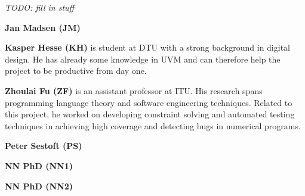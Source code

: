 \documentclass[fleqn,12pt]{article}
\newcommand{\todo}[1]{{\it TODO: #1}}
\begin{document}
\todo{fill in stuff}

{\bf Jan Madsen (JM)} 

{\bf Kasper Hesse (KH)} is student at DTU with a strong background in digital design.
He has already some knowledge in UVM and can therefore help the project to be productive
from day one.

{\bf Zhoulai Fu (ZF)} is an assistant professor at ITU. His research
spans programming language theory and software engineering
techniques. Related to this project, he worked on developing
constraint solving and automated testing techniques in achieving high
coverage and detecting bugs in numerical programs.

{\bf Peter Sestoft (PS)} 

{\bf NN PhD (NN1)} 

{\bf NN PhD (NN2)} 


%
\end{document}
